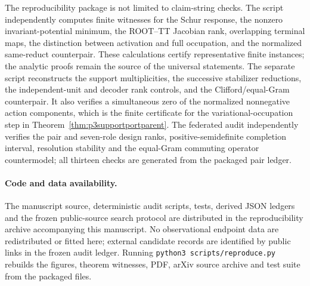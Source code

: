 The reproducibility package is not limited to claim-string checks.  The script
 independently computes finite
witnesses for the Schur response, the nonzero invariant-potential minimum, the
ROOT--TT Jacobian rank, overlapping terminal maps, the distinction between
activation and full occupation, and the normalized same-reduct counterpair.
These calculations certify representative finite instances; the analytic
proofs remain the source of the universal statements.  The separate script
 reconstructs the support
multiplicities, the successive stabilizer reductions, the independent-unit
and decoder rank controls, and the Clifford/equal-Gram counterpair.  It also
verifies a simultaneous zero of the normalized nonnegative action components,
which is the finite certificate for the variational-occupation step in
Theorem~\ref{thm:p3supportportparent}.
The federated audit independently verifies the pair and seven-role design
ranks, positive-semidefinite completion interval, resolution stability and
the equal-Gram commuting operator countermodel; all thirteen checks are
generated from the packaged pair ledger.

\paragraph{Code and data availability.}
The manuscript source, deterministic audit scripts, tests, derived JSON
ledgers and the frozen public-source search protocol are distributed in the
reproducibility archive accompanying this manuscript.  No observational
endpoint data are redistributed or fitted here; external candidate records
are identified by public links in the frozen audit ledger.  Running
\texttt{python3 scripts/reproduce.py} rebuilds the figures, theorem witnesses,
PDF, arXiv source archive and test suite from the packaged files.
